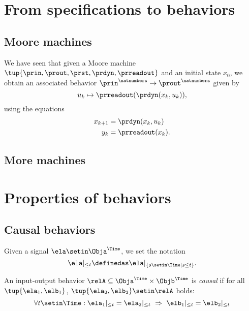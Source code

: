 \section{From specifications to behaviors}


\subsection{Moore machines}

We have seen that given a Moore machine $\tup{\prin, \prout, \prst, \prdyn, \prreadout}$ and an initial state $x_0$, we obtain an associated behavior $\prin^\natnumbers \to  \prout^\natnumbers$ given by
\begin{equation}
    u_k \mapsto \prreadout(\prdyn(x_k, u_k)),
\end{equation}
using the equations
\begin{align}
    x_{k+1} & = \prdyn(x_k, u_k) \\
    y_{k}   & = \prreadout(x_{k}).
\end{align}

\subsection{More machines}

\section{Properties of behaviors}

\subsection{Causal behaviors}

Given a signal $\ela \setin \Obja^\Time$, we set the notation
\begin{equation}
    \ela \vert_{\leq t} \definedas  \ela \vert_{\{ s \setin \Time \mid s \leq t\}}.
\end{equation}

\begin{definition}
    An input-output behavior $\relA \subseteq \Obja^\Time \times \Objb^\Time$ is \emph{causal} if for all~$\tup{\ela_1, \elb_1}$, $\tup{\ela_2, \elb_2} \setin \relA$ holds:
    \begin{equation}
        \forall t \setin \Time: \ela_1 \vert_{ \leq t} = \ela_2 \vert_{ \leq t} \  \Rightarrow \ \elb_1 \vert_{ \leq t} = \elb_2 \vert_{ \leq t}
    \end{equation}
\end{definition}

